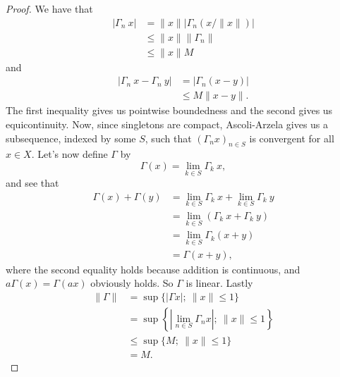 \documentclass[a4paper,12pt,twoside,BCOR=10mm]{scrbook}
\theoremstyle{definition}
\theoremstyle{definition}
\theoremstyle{definition}
\begin{document}
\begin{proof}
We have that
\begin{align*}
	|\Gamma_n\ x|
	&= \|x\| |\Gamma_n (x/\|x\|)|\\
	&\leq \|x\| \|\Gamma_n \|\\
	&\leq \|x\| M
\end{align*}
and
\begin{align*}
	|\Gamma_n\ x - \Gamma_n\ y|
	&= |\Gamma_n (x - y)|\\
	&\leq M\|x - y\|.
\end{align*}
The first inequality gives us pointwise boundedness and the second gives us equicontinuity.
Now, since singletons are compact, Ascoli-Arzela gives us a subsequence, indexed by some $S$, such that $(\Gamma_n x)_{n \in S}$ is convergent for all $x \in X$.
Let's now define $\Gamma$ by
\[
	\Gamma(x) = \lim_{k \in S} \Gamma_k\ x,
\]
and see that
\begin{align*}
	\Gamma(x) + \Gamma(y)
	&= \lim_{k \in S} \Gamma_k\ x + \lim_{k \in S} \Gamma_k\ y\\
	&= \lim_{k \in S} \left ( \Gamma_k\ x + \Gamma_k\ y \right )\\
	&= \lim_{k \in S} \Gamma_k(x + y)\\
	&= \Gamma(x + y),
\end{align*}
where the second equality holds because addition is continuous, and $a\Gamma(x) = \Gamma(ax)$ obviously holds.
So $\Gamma$ is linear.
Lastly
\begin{align*}
	\|\Gamma\|
	&= \sup \{|\Gamma x|;\ \|x\| \leq 1\}\\
	&= \sup \left \{ \left |\lim_{n \in S} \Gamma_n x \right|;\ \|x\| \leq 1 \right \}\\
	&\leq \sup \{ M;\ \|x\| \leq 1 \}\\
	&= M.
\end{align*}
\end{proof}
\end{document}
